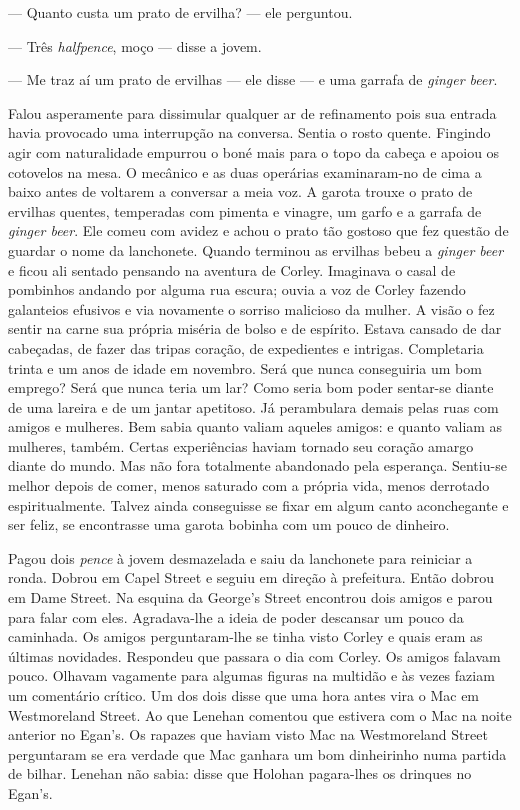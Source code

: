 --- Quanto custa um prato de ervilha? --- ele perguntou.

--- Três \textit{halfpence}, moço --- disse a jovem.

--- Me traz aí um prato de ervilhas --- ele disse --- e uma garrafa de
\textit{ginger beer}.

Falou asperamente para dissimular qualquer ar de refinamento pois sua entrada
havia provocado uma interrupção na conversa.  Sentia o rosto quente.  Fingindo
agir com naturalidade empurrou o boné mais para o topo da cabeça e apoiou os
cotovelos na mesa.  O mecânico e as duas operárias examinaram-no de cima a
baixo antes de voltarem a conversar a meia voz.  A garota trouxe o prato de
ervilhas quentes, temperadas com pimenta e vinagre, um garfo e a garrafa de
\textit{ginger beer}.  Ele comeu com avidez e achou o prato tão gostoso que fez
questão de guardar o nome da lanchonete.  Quando terminou as ervilhas bebeu a
\textit{ginger beer} e ficou ali sentado pensando na aventura de Corley.
Imaginava o casal de pombinhos andando por alguma rua escura; ouvia a voz de
Corley fazendo galanteios efusivos e via novamente o sorriso malicioso da
mulher.  A visão o fez sentir na carne sua própria miséria de bolso e de
espírito.  Estava cansado de dar cabeçadas, de fazer das tripas coração, de
expedientes e intrigas.  Completaria trinta e um anos de idade em novembro.
Será que nunca conseguiria um bom emprego?  Será que nunca teria um lar?  Como
seria bom poder sentar-se diante de uma lareira e de um jantar apetitoso.  Já
perambulara demais pelas ruas com amigos e mulheres.  Bem sabia quanto valiam
aqueles amigos: e quanto valiam as mulheres, também.  Certas experiências
haviam tornado seu coração amargo diante do mundo.  Mas não fora totalmente
abandonado pela esperança.  Sentiu-se melhor depois de comer, menos saturado
com a própria vida, menos derrotado espiritualmente.  Talvez ainda conseguisse
se fixar em algum canto aconchegante e ser feliz, se encontrasse uma garota
bobinha com um pouco de dinheiro.

Pagou dois \textit{pence} à jovem desmazelada e saiu da lanchonete para
reiniciar a ronda.  Dobrou em Capel Street e seguiu em direção à prefeitura.
Então dobrou em Dame Street.  Na esquina da George’s Street encontrou dois
amigos e parou para falar com eles.  Agradava-lhe a ideia de poder descansar um
pouco da caminhada.  Os amigos perguntaram-lhe se tinha visto Corley e quais
eram as últimas novidades.  Respondeu que passara o dia com Corley.  Os amigos
falavam pouco.  Olhavam vagamente para algumas figuras na multidão e às vezes
faziam um comentário crítico.  Um dos dois disse que uma hora antes vira o Mac
em Westmoreland Street.  Ao que Lenehan comentou que estivera com o Mac na
noite anterior no Egan’s.  Os rapazes que haviam visto Mac na Westmoreland
Street perguntaram se era verdade que Mac ganhara um bom dinheirinho numa
partida de bilhar.  Lenehan não sabia: disse que Holohan pagara-lhes os
drinques no Egan’s.

